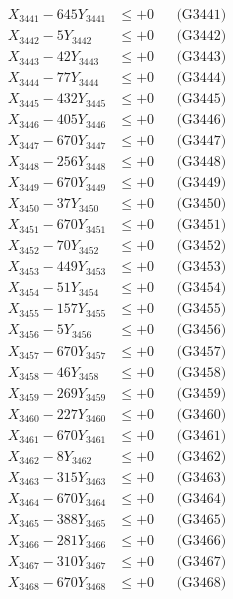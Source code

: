 \documentclass[a4paper,10pt]{article}
\begin{document}
{\begin{align}
\allowbreak
X_{3441} - 645Y_{3441} &\leq +0 && \text{(G3441)} \\
X_{3442} - 5Y_{3442} &\leq +0 && \text{(G3442)} \\
X_{3443} - 42Y_{3443} &\leq +0 && \text{(G3443)} \\
X_{3444} - 77Y_{3444} &\leq +0 && \text{(G3444)} \\
X_{3445} - 432Y_{3445} &\leq +0 && \text{(G3445)} \\
X_{3446} - 405Y_{3446} &\leq +0 && \text{(G3446)} \\
X_{3447} - 670Y_{3447} &\leq +0 && \text{(G3447)} \\
X_{3448} - 256Y_{3448} &\leq +0 && \text{(G3448)} \\
X_{3449} - 670Y_{3449} &\leq +0 && \text{(G3449)} \\
X_{3450} - 37Y_{3450} &\leq +0 && \text{(G3450)} \\
\allowbreak
X_{3451} - 670Y_{3451} &\leq +0 && \text{(G3451)} \\
X_{3452} - 70Y_{3452} &\leq +0 && \text{(G3452)} \\
X_{3453} - 449Y_{3453} &\leq +0 && \text{(G3453)} \\
X_{3454} - 51Y_{3454} &\leq +0 && \text{(G3454)} \\
X_{3455} - 157Y_{3455} &\leq +0 && \text{(G3455)} \\
X_{3456} - 5Y_{3456} &\leq +0 && \text{(G3456)} \\
X_{3457} - 670Y_{3457} &\leq +0 && \text{(G3457)} \\
X_{3458} - 46Y_{3458} &\leq +0 && \text{(G3458)} \\
X_{3459} - 269Y_{3459} &\leq +0 && \text{(G3459)} \\
X_{3460} - 227Y_{3460} &\leq +0 && \text{(G3460)} \\
\allowbreak
X_{3461} - 670Y_{3461} &\leq +0 && \text{(G3461)} \\
X_{3462} - 8Y_{3462} &\leq +0 && \text{(G3462)} \\
X_{3463} - 315Y_{3463} &\leq +0 && \text{(G3463)} \\
X_{3464} - 670Y_{3464} &\leq +0 && \text{(G3464)} \\
X_{3465} - 388Y_{3465} &\leq +0 && \text{(G3465)} \\
X_{3466} - 281Y_{3466} &\leq +0 && \text{(G3466)} \\
X_{3467} - 310Y_{3467} &\leq +0 && \text{(G3467)} \\
X_{3468} - 670Y_{3468} &\leq +0 && \text{(G3468)} \\

\end{align}}
\end{document}
